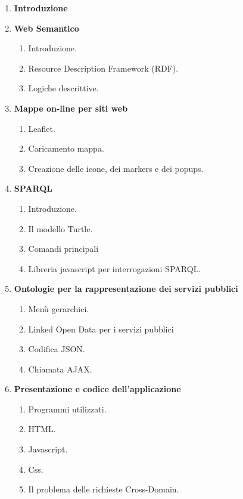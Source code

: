 \documentclass[a4paper,11pt]{article}
\begin{document}
\begin{enumerate}
	\item \LARGE{\textbf{Introduzione}}
	\bigskip
	\item \LARGE{\textbf{Web Semantico}}
		\begin{enumerate}[label*=\arabic*.]
			\Large
			\item Introduzione.
			\item Resource Description Framework (RDF).
			\item Logiche descrittive.
		\end{enumerate}
	\bigskip
	\item \LARGE{\textbf{Mappe on-line per siti web}}
		\begin{enumerate}[label*=\arabic*.]
			\Large
			\item Leaflet.
			\item Caricamento mappa.
			\item Creazione delle icone, dei markers e dei popups.
		\end{enumerate}
	\bigskip 
	\item \LARGE{\textbf{SPARQL}}
		\begin{enumerate}[label*=\arabic*.]
			\Large
			\item Introduzione.
			\item Il modello Turtle.
			\item Comandi principali
			\item Libreria javascript per interrogazioni SPARQL.
		\end{enumerate}
	\bigskip 
	\item \LARGE{\textbf{Ontologie per la rappresentazione dei servizi pubblici}}
		\begin{enumerate}[label*=\arabic*.]
			\Large
			\item Menù gerarchici.
			\item Linked Open Data per i servizi pubblici
			\item Codifica JSON.
			\item Chiamata AJAX.
		\end{enumerate}
	\bigskip 
	\item \LARGE{\textbf{Presentazione e codice dell'applicazione}}
		\begin{enumerate}[label*=\arabic*.]
			\Large
			\item Programmi utilizzati.
			\item HTML.
			\item Javascript.
			\item Css.
			\item Il problema delle richieste Cross-Domain.
		\end{enumerate}
\end{enumerate}
\bigskip 
		
\end{document}
